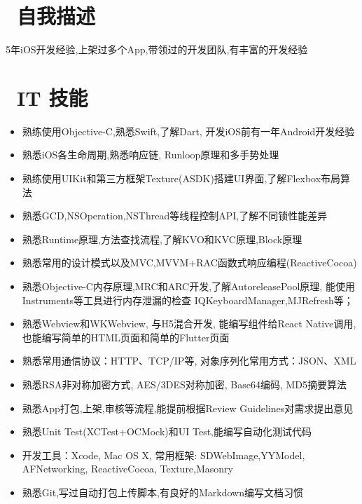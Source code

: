 \documentclass{resume}
\begin{document}


 
\section{\faHistory\ 自我描述}
\begin{onehalfspacing}
5年iOS开发经验,上架过多个App,带领过的开发团队,有丰富的开发经验
\end{onehalfspacing}

\section{\faCogs\ IT 技能}
\begin{itemize}[parsep=0.5ex]

\item 熟练使用Objective-C,熟悉Swift,了解Dart, 开发iOS前有一年Android开发经验
\item 熟悉iOS各生命周期,熟悉响应链, Runloop原理和多手势处理
\item 熟练使用UIKit和第三方框架Texture(ASDK)搭建UI界面,了解Flexbox布局算法
\item 熟悉GCD,NSOperation,NSThread等线程控制API,了解不同锁性能差异
\item 熟悉Runtime原理,方法查找流程,了解KVO和KVC原理,Block原理
\item 熟悉常用的设计模式以及MVC,MVVM+RAC函数式响应编程(ReactiveCocoa)
\item 熟悉Objective-C内存原理,MRC和ARC开发,了解AutoreleasePool原理, 能使用Instruments等工具进行内存泄漏的检查
IQKeyboardManager,MJRefresh等；
\item 熟悉Webview和WKWebview, 与H5混合开发, 能编写组件给React Native调用,也能编写简单的HTML页面和简单的Flutter页面
\item 熟悉常用通信协议：HTTP、TCP/IP等, 对象序列化常用方式：JSON、XML
\item 熟悉RSA非对称加密方式, AES/3DES对称加密, Base64编码, MD5摘要算法
\item 熟悉App打包,上架,审核等流程,能提前根据Review Guidelines对需求提出意见
\item 熟悉Unit Test(XCTest+OCMock)和UI Test,能编写自动化测试代码
\item 开发工具：Xcode, Mac OS X, 常用框架: SDWebImage,YYModel, AFNetworking, ReactiveCocoa, Texture,Masonry
\item 熟悉Git,写过自动打包上传脚本,有良好的Markdown编写文档习惯

\end{itemize}
\end{document}

